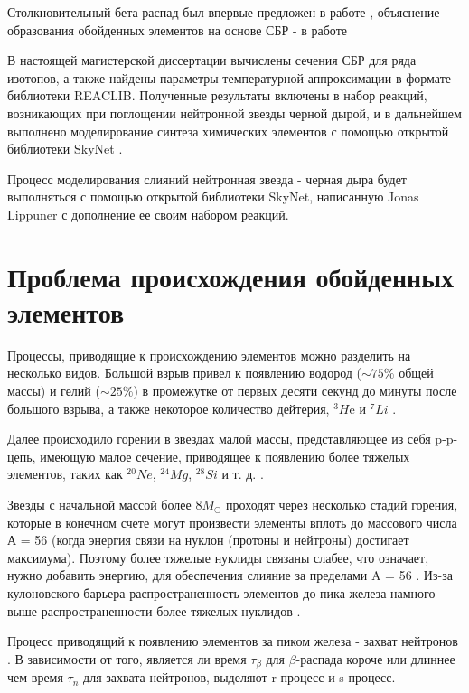 \documentclass[14pt, a4paper]{article}
\numberwithin{figure}{section}
\numberwithin{equation}{section}
\begin{document}
Столкновительный бета-распад был впервые предложен в работе \cite{batkin}, объяснение образования обойденных элементов на
основе СБР - в работе \cite{tak}

В настоящей магистерской диссертации вычислены сечения СБР для ряда изотопов, а также найдены параметры температурной аппроксимации в формате библиотеки REACLIB. Полученные результаты включены в набор реакций, возникающих при поглощении нейтронной звезды черной дырой, и в дальнейшем выполнено моделирование синтеза химических элементов с помощью открытой библиотеки SkyNet \cite{skynet}. 

Процесс моделирования слияний нейтронная звезда - черная дыра будет выполняться с помощью открытой библиотеки SkyNet, написанную Jonas Lippuner с дополнение ее своим набором реакций.


\section{Проблема происхождения обойденных элементов}

Процессы, приводящие к происхождению элементов можно разделить на несколько видов. Большой взрыв привел к появлению водород ($\sim75\%$ общей массы) и гелий ($\sim25\%$) в промежутке от первых десяти секунд до минуты после большого взрыва, а также некоторое количество дейтерия, $^3H$e и $^7Li$ \cite{Tytler}.

 Далее происходило горении в звездах малой массы, представляющее из себя p-p-цепь, имеющую малое сечение, приводящее к появлению более тяжелых элементов, таких как $^{20}Ne$, $^{24}Mg$, $^{28}Si$ и т. д. \cite{cauldrons, energy, interiors}. 
 
 Звезды с начальной массой более $8 M_\odot$ проходят через несколько стадий горения, которые в конечном счете могут произвести элементы вплоть до массового числа А = 56 (когда энергия связи на нуклон (протоны и нейтроны) достигает максимума). Поэтому более тяжелые нуклиды связаны слабее, что означает, нужно добавить энергию, для обеспечения слияние за пределами A = 56 \cite{cauldrons, qse, massive}. Из-за кулоновского барьера распространенность элементов до пика железа намного выше распространенности более тяжелых нуклидов \cite{iron-abu}.
 
 Процесс приводящий к появлению элементов за пиком железа - захват нейтронов \cite{cauldrons}. В зависимости от того, является ли время $\tau_\beta$ для $\beta$-распада короче или длиннее чем время $\tau_n$ для захвата нейтронов, выделяют r-процесс и s-процесс.
 
\end{document}
